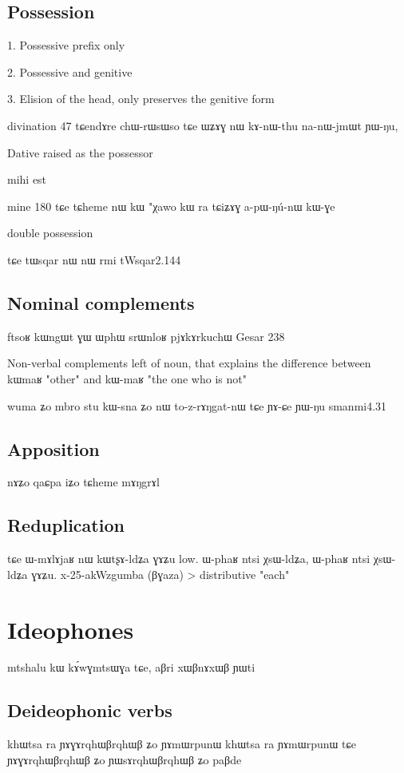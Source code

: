 \documentclass[oldfontcommands,oneside,a4paper,11pt]{memoir}
\begin{document}
\section{Possession} \label{sec:possession}
1. Possessive prefix only

2. Possessive and genitive

3. Elision of the head, only preserves the genitive form

divination
47	tɕendɤre chɯ-rɯsɯso tɕe ɯʑɤɣ nɯ kɤ-nɯ-thu na-nɯ-jmɯt ɲɯ-ŋu,


Dative raised as the possessor

mihi est

mine
180	tɕe	tɕheme	nɯ	kɯ	"χawo	kɯ	ra	tɕiʑɤɣ	a-pɯ-ŋú-nɯ	kɯ-ɣe


double possession


  tɕe tɯsqar nɯ nɯ rmi
  tWsqar2.144
\section{Nominal complements}  \label{sec:nom.comp}
ftsoʁ kɯngɯt ɣɯ ɯphɯ srɯnloʁ pjɤkɤrkuchɯ
Gesar 238

Non-verbal complements left of noun, that explains the difference between kɯmaʁ "other" and kɯ-maʁ "the one who is not"


wuma ʑo mbro stu kɯ-sna ʑo nɯ to-z-rɤŋgat-nɯ tɕe ɲɤ-ɕe ɲɯ-ŋu
smanmi4.31
\section{Apposition}
nɤʑo qaɕpa
iʑo tɕheme mɤŋgrɤl

\section{Reduplication}


tɕe ɯ-mɤlɤjaʁ nɯ kɯtʂɤ-ldʑa ɣɤʑu low.
ɯ-phaʁ ntsi χsɯ-ldʑa, ɯ-phaʁ ntsi χsɯ-ldʑa ɣɤʑu.
x-25-akWzgumba
(βɣaza)
> distributive "each"
\chapter{Ideophones}


mtshalu kɯ kɤ́wɣmtsɯɣa tɕe, aβri xɯβnɤxɯβ ɲɯti
\section{Deideophonic verbs}
khɯtsa ra ɲɤɣɤrqhɯβrqhɯβ ʑo ɲɤmɯrpunɯ
khɯtsa ra ɲɤmɯrpunɯ tɕe ɲɤɣɤrqhɯβrqhɯβ ʑo
ɲɯsɤrqhɯβrqhɯβ ʑo paβde
\end{document}
